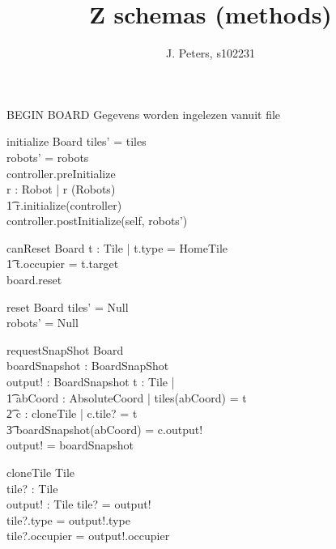 \documentclass[a4paper,11pt]{article}
\begin{document}
\title{Z schemas (methods)}
\author{J. Peters, s102231}
\maketitle


BEGIN BOARD
Gegevens worden ingelezen vanuit file
\begin{schema}{initialize}
\Delta Board
\where
tiles' = tiles \\
robots' = robots \\
controller.preInitialize \\
\forall r : Robot | r \in \dom(Robots) \implies \\ \t1
r.initialize(controller) \\ 
controller.postInitialize(self, robots')
\end{schema}

\begin{schema}{canReset}
\Delta Board
\where
\IF \exists t : Tile | t.type = HomeTile \\ \t1
t.occupier = t.target \\
\THEN board.reset
\end{schema}

\begin{schema}{reset}
\Delta Board
\where
tiles' = Null \\
robots' = Null
\end{schema}

\begin{schema}{requestSnapShot}
\Xi Board \\
boardSnapshot : BoardSnapShot \\
output! : BoardSnapshot
\where
\forall t : Tile |  \\ \t1
\exists abCoord : AbsoluteCoord | tiles(abCoord) = t \implies \\ \t2
\exists c : cloneTile | c.tile? = t \\ \t3
boardSnapshot(abCoord) = c.output! \\
output! = boardSnapshot
\end{schema}

\begin{schema}{cloneTile}
\Delta Tile \\
tile? : Tile \\
output! : Tile 
\where
tile? \not = output! \\
tile?.type = output!.type \\
tile?.occupier = output!.occupier 
\end{schema}
\end{document}
